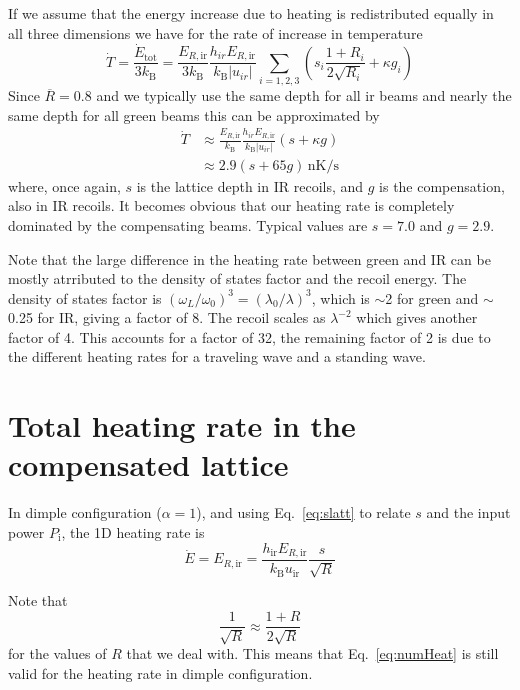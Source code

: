 \documentclass[11pt,letter]{article}
\newcommand{\pin}{\ensuremath{ P_{\text{i}}} }
\begin{document}
If we assume that the energy increase due to heating is redistributed equally
in all three dimensions we have for the rate of increase in temperature 
\begin{equation}
\boxed{ 
  \dot{T} = \frac{\dot{E}_{\text{tot}}}{ 3k_{\text{B}}} = 
  \frac{E_{R,\text{ir}}}{ 3 k_{\text{B}} }  
 \frac{ h_{ir} E_{R,\text{ir}} }{k_{\text{B}}|u_{ir}|}
  \sum_{i=1,2,3} 
  \left(
  s_{i} \frac{1+R_{i}}{2\sqrt{R_{i}}}  + 
  \kappa g_{i} \right) }
\end{equation}
Since $\overline{R}=0.8$ and  we typically use the same depth for all ir
beams and nearly the same depth for all green beams this can be approximated
by 
\begin{equation}
\begin{split}
  \dot{T} & \approx  \frac{E_{R,\text{ir}}}{  k_{\text{B}} }  
 \frac{ h_{ir} E_{R,\text{ir}} }{k_{\text{B}}|u_{ir}|}
  \left(
  s  + 
  \kappa g\right) \\
   & \approx  2.9 ( s + 65 g) \,\text{nK/s} 
\end{split}
\label{eq:numHeat}
\end{equation}
where, once again, $s$ is the lattice depth in IR recoils, and $g$ is the
compensation, also in IR recoils. It becomes obvious that our heating rate is
completely dominated by the compensating beams.   Typical values are $s=7.0$
and $g=2.9$.

Note that the large difference in the heating rate between green and IR can be
mostly atrributed to the density of states factor and the recoil energy.   The
density of states factor is $(\omega_{L}/\omega_{0})^{3} =
(\lambda_{0}/\lambda)^{3}$, which is $\sim$2 for green and $\sim$0.25  for IR,
giving a factor of 8.   The recoil scales as $\lambda^{-2}$ which gives another
factor of 4.   This accounts for a factor of 32,  the remaining factor of 2 is
due to the different heating rates for a traveling wave and a standing wave.  

\section{Total heating rate in the compensated lattice}

In dimple configuration ($\alpha=1$), and using Eq.~\ref{eq:slatt} to relate $s$ and the input power $\pin$, the 1D heating rate is 
\begin{equation}
  \dot{E} = E_{R,\text{ir}} = 
  \frac{ h_{\text{ir}} E_{R,\text{ir}} }{ k_{\text{B}} u_{\text{ir}} } 
  \frac{s}{\sqrt{R}} 
\end{equation}

Note that \[  \frac{1}{\sqrt{R}} \approx  \frac{1+R}{2\sqrt{R}} \] for the
values of $R$ that we deal with.   This means that Eq.~\ref{eq:numHeat} is
still valid for the heating rate in dimple configuration. 



\end{document}

